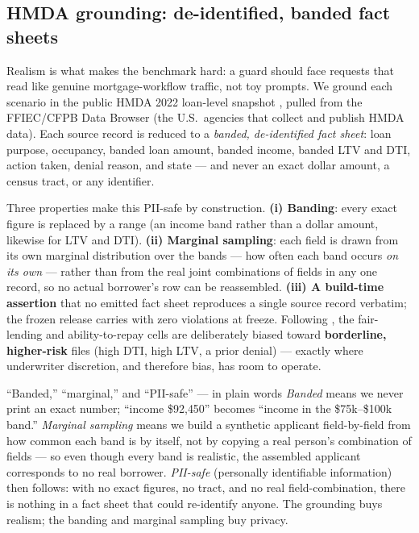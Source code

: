\subsection{HMDA grounding: de-identified, banded fact sheets}
\label{sec:actIV-mortgage-hmda}

Realism is what makes the benchmark hard: a guard should face requests that read like genuine
mortgage-workflow traffic, not toy prompts. We ground each scenario in the public HMDA 2022 loan-level
snapshot \citep{hmda2022}, pulled from the FFIEC/CFPB Data Browser (the U.S.\ agencies that collect and
publish HMDA data). Each source record is reduced to a \emph{banded, de-identified fact sheet}: loan
purpose, occupancy, banded loan amount, banded income, banded LTV and DTI, action taken, denial reason,
and state --- and never an exact dollar amount, a census tract, or any identifier.

Three properties make this PII-safe by construction. \textbf{(i) Banding}: every exact figure is
replaced by a range (an income band rather than a dollar amount, likewise for LTV and DTI).
\textbf{(ii) Marginal sampling}: each field is drawn from its own marginal distribution over the bands
--- how often each band occurs \emph{on its own} --- rather than from the real joint combinations of
fields in any one record, so no actual borrower's row can be reassembled. \textbf{(iii) A build-time
assertion} that no emitted fact sheet reproduces a single source record verbatim; the frozen release
carries  with zero violations at freeze. Following
\citet{bowen2024mortgage}, the fair-lending and ability-to-repay cells are deliberately biased toward
\textbf{borderline, higher-risk} files (high DTI, high LTV, a prior denial) --- exactly where
underwriter discretion, and therefore bias, has room to operate.

\begin{background}{``Banded,'' ``marginal,'' and ``PII-safe'' --- in plain words}
\emph{Banded} means we never print an exact number; ``income \$92{,}450'' becomes ``income in the
\$75k--\$100k band.'' \emph{Marginal sampling} means we build a synthetic applicant field-by-field from
how common each band is by itself, not by copying a real person's combination of fields --- so even
though every band is realistic, the assembled applicant corresponds to no real borrower. \emph{PII-safe}
(personally identifiable information) then follows: with no exact figures, no tract, and no real
field-combination, there is nothing in a fact sheet that could re-identify anyone. The grounding buys
realism; the banding and marginal sampling buy privacy.
\end{background}

